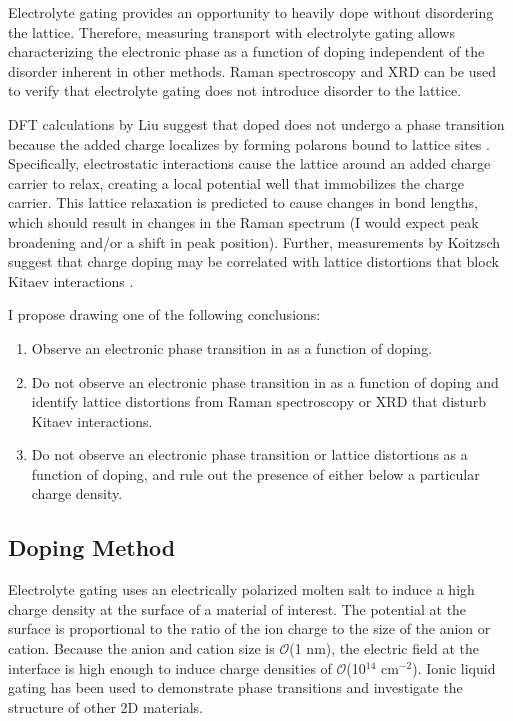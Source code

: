 \documentclass[11pt]{article}
\begin{document}
Electrolyte gating provides an opportunity to heavily dope \rucl without disordering the lattice. Therefore, measuring transport with electrolyte gating allows characterizing the electronic phase as a function of doping independent of the disorder inherent in other methods. Raman spectroscopy and XRD can be used to verify that electrolyte gating does not introduce disorder to the lattice.

DFT calculations by Liu suggest that doped \rucl does not undergo a phase transition because the added charge localizes by forming polarons bound to lattice sites \cite{Liu2018}. Specifically, electrostatic interactions cause the lattice around an added charge carrier to relax, creating a local potential well that immobilizes the charge carrier. This lattice relaxation is predicted to cause changes in bond lengths, which should result in changes in the Raman spectrum (I would expect peak broadening and/or a shift in peak position). Further, measurements by Koitzsch suggest that charge doping may be correlated with lattice distortions that block Kitaev interactions \cite{Koitzsch2017a}.

I propose drawing one of the following conclusions:
\begin{enumerate}
	\item Observe an electronic phase transition in \rucl as a function of doping.
	\item Do not observe an electronic phase transition in \rucl as a function of doping and identify lattice distortions from Raman spectroscopy or XRD that disturb Kitaev interactions.
	\item Do not observe an electronic phase transition or lattice distortions as a function of doping, and rule out the presence of either below a particular charge density.
\end{enumerate}
	

\subsection{Doping Method}

Electrolyte gating uses an electrically polarized molten salt to induce a high charge density at the surface of a material of interest. The potential at the surface is proportional to the ratio of the ion charge to the size of the anion or cation. Because the anion and cation size is $\mathcal{O}$(1 nm), the electric field at the interface is high enough to induce charge densities of $\mathcal{O}$(10$^{14}$ cm$^{-2}$). Ionic liquid gating has been used to demonstrate phase transitions and investigate the structure of other 2D materials\cite{Braga2012,Ueno2008}.
\end{document}
